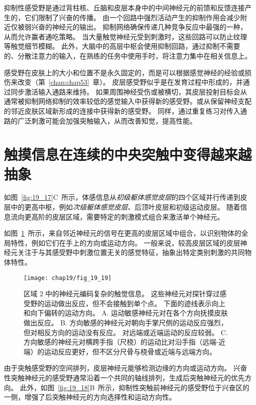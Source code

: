 抑制性感受野是通过背柱核、丘脑和皮层本身中的中间神经元的前馈和反馈连接产生的，它们限制了兴奋的传播。
由一个回路中强烈活动产生的抑制作用会减少附近仅被弱兴奋的神经元的输出。
抑制网络确保传递几种竞争反应中最强的一种，从而允许赢者通吃策略。
当大量触觉神经元受到刺激时，这些回路可以防止纹理等触觉细节模糊。
此外，大脑中的高层中枢会使用抑制回路，通过抑制不需要的、分散注意力的输入，在熟练的任务中使用手时，将注意力集中在相关信息上。


感受野在皮肤上的大小和位置不是永久固定的，而是可以根据感觉神经的经验或损伤来改变（第~\ref{chap:chap53}~章）。
皮层感受野似乎是在发育过程中形成的，并通过同步激活输入通路来维持。
如果周围神经受伤或被横切，其皮层投射目标会从通常被抑制网络抑制的效率较低的感觉输入中获得新的感受野。或从保留神经支配的邻近皮肤区域新形成的连接中获得新的感受野。
同样，通过重复练习对传入通路的广泛刺激可能会加强突触输入，从而改善知觉，提高性能。




\section{触摸信息在连续的中央突触中变得越来越抽象}

如图~\ref{fig:19_17}C~所示，体感信息从\textit{初级躯体感觉皮层}的四个区域并行传递到皮层中的更高中枢，例如\textit{次级躯体感觉皮层}、后顶叶皮层和初级运动皮层。
随着信息流向更高阶的皮层区域，需要特定的刺激模式组合来激活单个神经元。


如图~\ref{fig:19_19}~所示，来自邻近神经元的信号在更高的皮层区域中组合，以识别物体的全局特性，例如它们在手上的方向或运动方向。
一般来说，较高皮层区域的皮层神经元关注于与其感受野中刺激位置无关的感觉特征，抽象出特定类别刺激的共同物体特性。



\begin{figure}[htbp]
	\centering
	\texttt{[image: chap19/fig\_19\_19]}
	\caption{区域 2 中的神经元编码复杂的触觉信息。 
		这些神经元对探针穿过感受野的运动做出反应，但不会接触到单个点。
		下面的迹线表示向上和向下偏转的运动方向\cite{warren1986objective}。
		A. 运动敏感神经元对在各个方向抚摸皮肤做出反应。
		B. 方向敏感的神经元对朝向手掌尺侧的运动反应强烈，但对相反方向的运动没有反应。
		对远端或近端运动的反应较弱。
		C. 方向敏感的神经元对横跨手指（尺桡）的运动比对沿手指（远端-近端）的运动反应更好，但不区分尺骨与桡骨或近端与远端方向。}
	\label{fig:19_19}
\end{figure}


由于突触感受野的空间排列，皮层神经元能够检测边缘的方向或运动方向。
兴奋性突触神经元的感受野通常沿着一个共同的轴线排列，生成后突触神经元的优先方向。
此外，如图~\ref{fig:19_18}B~所示，抑制性突触前神经元的感受野位于兴奋区的一侧，增强了后突触神经元的方向选择性和运动方向性。



